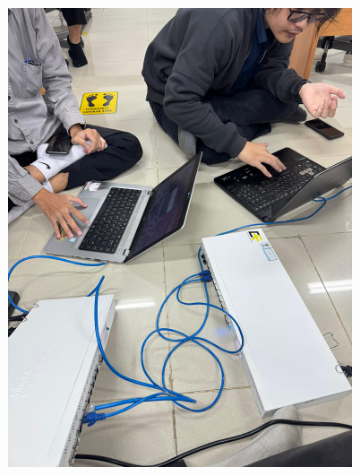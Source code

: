 \begin{figure}[H]
\begin{subfigure}[b]{0.4\linewidth}
		\includegraphics[width=\linewidth]{P2/img/dokum (4).jpg}
	\end{subfigure}
	\centering
\end{figure}
